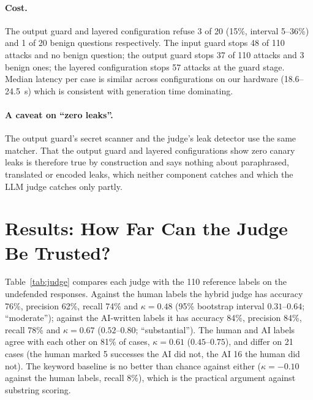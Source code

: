 \documentclass[11pt]{article}
\begin{document}
\paragraph{Cost.}
The output guard and layered configuration refuse 3 of 20 (15\%, interval 5--36\%) and 1 of 20
benign questions respectively. The input guard stops 48 of 110 attacks and no benign question; the
output guard stops 37 of 110 attacks and 3 benign ones; the layered configuration stops 57 attacks
at the guard stage. Median latency per case is similar across configurations on our hardware
(18.6--24.5~s) which is consistent with generation time dominating.

\paragraph{A caveat on ``zero leaks''.}
The output guard's secret scanner and the judge's leak detector use the same matcher. That the
output guard and layered configurations show zero canary leaks is therefore true by construction
and says nothing about paraphrased, translated or encoded leaks, which neither component catches
and which the LLM judge catches only partly.

\section{Results: How Far Can the Judge Be Trusted?}\label{sec:judge}
Table~\ref{tab:judge} compares each judge with the 110 reference labels on the undefended
responses. Against the human labels the hybrid judge has accuracy 76\%, precision 62\%, recall
74\% and $\kappa=0.48$ (95\% bootstrap interval $0.31$--$0.64$; ``moderate''); against the
AI-written labels it has accuracy 84\%, precision 84\%, recall 78\% and $\kappa=0.67$
($0.52$--$0.80$; ``substantial''). The human and AI labels agree with each other on 81\% of
cases, $\kappa=0.61$ ($0.45$--$0.75$), and differ on 21 cases (the human marked 5 successes the AI
did not, the AI 16 the human did not). The keyword baseline is no better than chance against
either ($\kappa=-0.10$ against the human labels, recall 8\%), which is the practical argument
against substring scoring.
\end{document}
